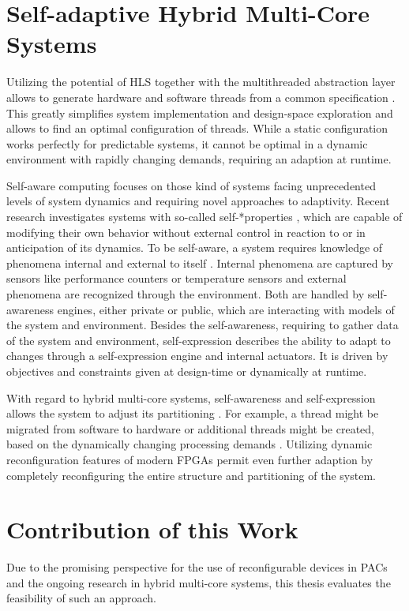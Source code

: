 \section{Self-adaptive Hybrid Multi-Core Systems}
Utilizing the potential of \ac{HLS} together with the multithreaded
abstraction layer allows to generate hardware and software threads from a
common specification \citep{CBN11}. This greatly simplifies system
implementation and design-space exploration and allows to find an optimal
configuration of threads. While a static configuration works perfectly for
predictable systems, it cannot be optimal in a dynamic environment with
rapidly changing demands, requiring an adaption at runtime.

Self-aware computing focuses on those kind of systems facing unprecedented
levels of system dynamics and requiring novel approaches to adaptivity. Recent
research investigates systems with so-called self-*properties \citep{SMC11},
which are capable of modifying their own behavior without external control in
reaction to or in anticipation of its dynamics. To be self-aware, a system
requires knowledge of phenomena internal and external to itself \citep{LCP11}.
Internal phenomena are captured by sensors like performance counters or
temperature sensors and external phenomena are recognized through the
environment. Both are handled by self-awareness engines, either private or
public, which are interacting with models of the system and environment.
Besides the self-awareness, requiring to gather data of the system and
environment, self-expression describes the ability to adapt to changes through
a self-expression engine and internal actuators. It is driven by objectives
and constraints given at design-time or dynamically at runtime.

With regard to hybrid multi-core systems, self-awareness and self-expression
allows the system to adjust its partitioning \citep{AHL14}. For example, a
thread might be migrated from software to hardware or additional threads might
be created, based on the dynamically changing processing demands
\citep{HLP09}. Utilizing dynamic reconfiguration features of modern \acp{FPGA}
permit even further adaption by completely reconfiguring the entire structure
and partitioning of the system.

\section{Contribution of this Work}
Due to the promising perspective for the use of reconfigurable devices in
\acp{PAC} and the ongoing research in hybrid multi-core systems, this thesis
evaluates the feasibility of such an approach.

